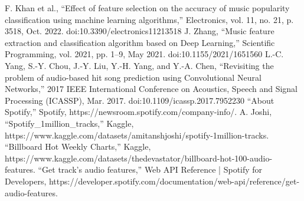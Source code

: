 \documentclass[conference]{IEEEtran}
\begin{document}
\begin{thebibliography}{00}
 F. Khan et al., “Effect of feature selection on the accuracy of music popularity classification using machine learning algorithms,” Electronics, vol. 11, no. 21, p. 3518, Oct. 2022. doi:10.3390/electronics11213518  
 J. Zhang, “Music feature extraction and classification algorithm based on Deep Learning,” Scientific Programming, vol. 2021, pp. 1–9, May 2021. doi:10.1155/2021/1651560  
 L.-C. Yang, S.-Y. Chou, J.-Y. Liu, Y.-H. Yang, and Y.-A. Chen, “Revisiting the problem of audio-based hit song prediction using Convolutional Neural Networks,” 2017 IEEE International Conference on Acoustics, Speech and Signal Processing (ICASSP), Mar. 2017. doi:10.1109/icassp.2017.7952230
 “About Spotify,” Spotify, https://newsroom.spotify.com/company-info/. 
 A. Joshi, “Spotify\_1million\_tracks,” Kaggle, https://www.kaggle.com/datasets/amitanshjoshi/spotify-1million-tracks. 
 “Billboard Hot Weekly Charts,” Kaggle, https://www.kaggle.com/datasets/thedevastator/billboard-hot-100-audio-features. 
 “Get track’s audio features,” Web API Reference | Spotify for Developers, https://developer.spotify.com/documentation/web-api/reference/get-audio-features.

\end{thebibliography}
\end{document}
